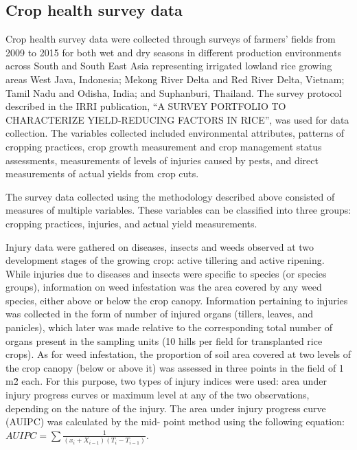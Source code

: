 \subsection*{Crop health survey data}

Crop health survey data were collected through surveys of farmers' fields from 2009 to 2015 for both wet and dry seasons in different production environments across South and South East Asia representing irrigated lowland rice growing areas West Java, Indonesia; Mekong River Delta and Red River Delta, Vietnam; Tamil Nadu and Odisha, India; and Suphanburi, Thailand. The survey protocol described in the IRRI publication, ``A SURVEY PORTFOLIO TO CHARACTERIZE YIELD-REDUCING FACTORS IN RICE'',  was used for data collection. The variables collected included environmental attributes, patterns of cropping practices, crop growth measurement and crop management status assessments, measurements of levels of injuries caused by pests, and direct measurements of actual yields from crop cuts. 

The survey data collected using the methodology described above consisted of measures of multiple variables. These variables can be classified into three groups: cropping practices, injuries, and actual yield measurements. 

Injury data were gathered on diseases, insects and weeds observed at two development stages of the growing crop: active tillering and active ripening. While injuries due to diseases and insects were specific to species (or species groups), information on weed infestation was the area covered by any weed species, either above or below the crop canopy. Information pertaining to injuries was collected in the form of number of injured organs (tillers, leaves, and panicles), which later was made relative to the corresponding total number of organs present in the sampling units (10 hills per field for transplanted rice crops). As for weed infestation, the proportion of soil area covered at two levels of the crop canopy (below or above it) was assessed in three points in the field of 1 m\^{2} each. For this purpose, two types of injury indices were used: area under injury progress curves or maximum level at any of the two observations, depending on the nature of the injury. The area under injury progress curve (AUIPC) was calculated by the mid- point method using the following equation: $AUIPC = \sum \frac{1}{(x_{i} + X_{i-1})(T_{i} - T_{i-1})}$. %

